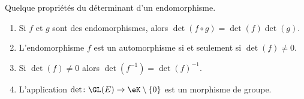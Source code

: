 \begin{proposition}
    Quelque propriétés du déterminant d'un endomorphisme.
    \begin{enumerate}
        \item
            Si \( f\) et \( g\)  sont des endomorphismes, alors \( \det(f\circ g)=\det(f)\det(g)\).
        \item
            L'endomorphisme \( f\) est un automorphisme si et seulement si \( \det(f)\neq 0\).
        \item
            Si \( \det(f)\neq 0\) alors \( \det(f^{-1})=\det(f)^{-1}\).
        \item
            L'application \( \det\colon \GL(E)\to \eK\setminus\{ 0 \}\) est un morphisme de groupe.
    \end{enumerate}
\end{proposition}

